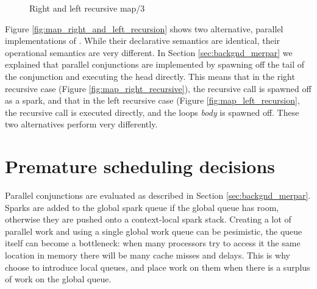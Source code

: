 \begin{figure}
\begin{center}
%
\end{center}
\caption{Right and left recursive map/3}
\label{fig:map_right_and_left_recursive}
\end{figure}

Figure \ref{fig:map_right_and_left_recursion} shows two alternative, parallel
implementations of .
While their declarative semantics are identical,
their operational semantics are very different.  In Section
\ref{sec:backgnd_merpar} we explained that parallel conjunctions are
implemented by spawning off the tail of the conjunction and executing the
head directly.
This means that in the right recursive case (Figure
\ref{fig:map_right_recursive}), the recursive call is spawned off as a
spark,
and that in the left recursive case (Figure \ref{fig:map_left_recursion},
the recursive call is executed directly, and the loops \emph{body} is
spawned off.
These two alternatives perform very differently.


\section{Premature scheduling decisions}

Parallel conjunctions are evaluated as described in Section
\ref{sec:backgnd_merpar}.
Sparks are added to the global spark queue if the global queue has room,
otherwise they are pushed onto a context-local spark stack.
Creating a lot of parallel work and using a single global work queue can be
pesimistic,
the queue itself can become a bottleneck:
when many processors try to access it the same location in memory there will
be many cache misses and delays.
This is why \citet{wang-hons} choose to introduce local queues,
and place work on them when there is a surplus of work on the global queue.

